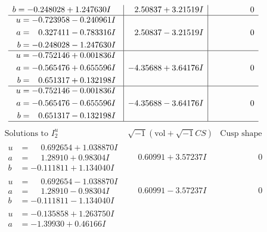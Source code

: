 \documentclass[1p]{elsarticle_modified}
\theoremstyle{definition}
\newcommand{\I}{\sqrt{-1}}
\begin{document}
$$\begin{array}{c|c|c}
\begin{aligned}
b &= -0.248028 + 1.247630 I\end{aligned}
 & \phantom{-}2.50837 + 3.21519 I & \phantom{-0.000000 } 0 \\ \hline\begin{aligned}
u &= -0.723958 - 0.240961 I \\
a &= \phantom{-}0.327411 - 0.783316 I \\
b &= -0.248028 - 1.247630 I\end{aligned}
 & \phantom{-}2.50837 - 3.21519 I & \phantom{-0.000000 } 0 \\ \hline\begin{aligned}
u &= -0.752146 + 0.001836 I \\
a &= -0.565476 + 0.655596 I \\
b &= \phantom{-}0.651317 + 0.132198 I\end{aligned}
 & -4.35688 + 3.64176 I & \phantom{-0.000000 } 0 \\ \hline\begin{aligned}
u &= -0.752146 - 0.001836 I \\
a &= -0.565476 - 0.655596 I \\
b &= \phantom{-}0.651317 - 0.132198 I\end{aligned}
 & -4.35688 - 3.64176 I & \phantom{-0.000000 } 0\\
 \hline 
 \end{array}$$\newpage$$\begin{array}{c|c|c}  
\text{Solutions to }I^u_{2}& \I (\text{vol} + \sqrt{-1}CS) & \text{Cusp shape}\\
 \hline 
\begin{aligned}
u &= \phantom{-}0.692654 + 1.038870 I \\
a &= \phantom{-}1.28910 + 0.98304 I \\
b &= -0.111811 + 1.134040 I\end{aligned}
 & \phantom{-}0.60991 + 3.57237 I & \phantom{-0.000000 } 0 \\ \hline\begin{aligned}
u &= \phantom{-}0.692654 - 1.038870 I \\
a &= \phantom{-}1.28910 - 0.98304 I \\
b &= -0.111811 - 1.134040 I\end{aligned}
 & \phantom{-}0.60991 - 3.57237 I & \phantom{-0.000000 } 0 \\ \hline\begin{aligned}
u &= -0.135858 + 1.263750 I \\
a &= -1.39930 + 0.46166 I \\

\end{aligned}
\end{array}$$
\end{document}
